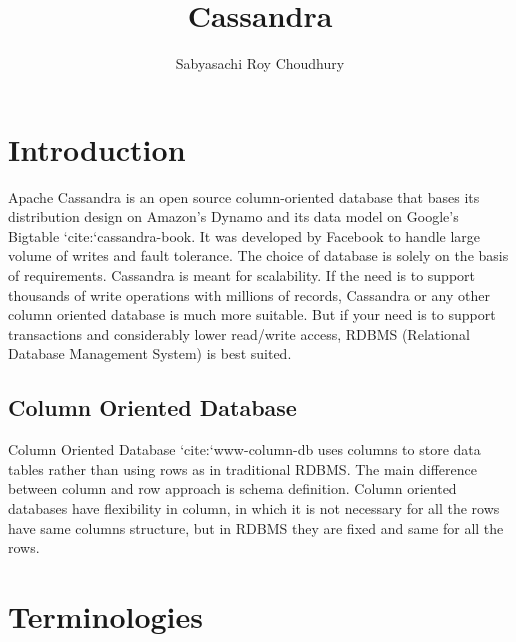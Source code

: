 \documentclass[9pt,twocolumn,twoside]{../../styles/osajnl}
\title{Cassandra}
\author[1]{Sabyasachi Roy Choudhury}
\affil[1]{School of Informatics and Computing, Bloomington, IN 47408, U.S.A.}
\affil[*]{Corresponding authors: sabyasachi087@gmail.com}
\begin{document}
\maketitle

\section{Introduction}

Apache Cassandra is an open source column-oriented database that bases its distribution design on Amazon’s Dynamo and its data model on Google’s Bigtable {`cite:`cassandra-book}. It was developed by Facebook to handle large volume of writes and fault tolerance. The choice of database is solely on the basis of requirements. Cassandra is meant for scalability. If the need is to support thousands of write operations with millions of records, Cassandra or any other column oriented database  is much more suitable. But if your need is to support transactions and considerably lower read/write access, RDBMS (Relational Database Management System) is best suited.

\subsection{Column Oriented Database}

Column Oriented Database {`cite:`www-column-db} uses columns to store data tables rather than using rows as in traditional RDBMS. The main difference between column and row approach is schema definition. Column oriented databases have flexibility in column, in which it is not necessary for all the rows have same columns structure, but in RDBMS they are fixed and same for all the rows.

\section{Terminologies}
\end{document}
